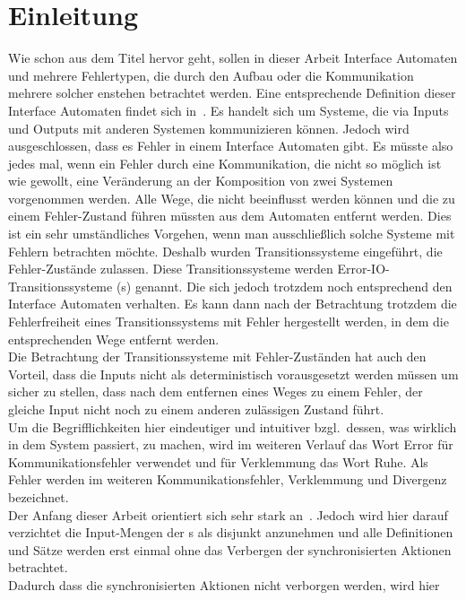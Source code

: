 \chapter{Einleitung}

Wie schon aus dem Titel hervor geht, sollen in dieser Arbeit Interface
Automaten und mehrere Fehlertypen, die durch den Aufbau oder die Kommunikation mehrere solcher enstehen
betrachtet werden. Eine entsprechende Definition dieser Interface Automaten
findet sich in~\cite{Alfaro2004}. Es handelt sich um Systeme, die via
Inputs und Outputs mit anderen Systemen kommunizieren können. Jedoch wird
ausgeschlossen, dass es Fehler in einem Interface Automaten gibt. Es müsste
also jedes mal, wenn ein Fehler durch eine Kommunikation, die nicht so möglich
ist wie gewollt, eine Veränderung an der Komposition von zwei Systemen
vorgenommen werden. Alle Wege, die nicht beeinflusst werden
können und die zu einem Fehler-Zustand führen müssten aus dem Automaten
entfernt werden. Dies ist ein sehr umständliches Vorgehen, wenn man
ausschließlich solche Systeme mit Fehlern betrachten möchte. Deshalb wurden
Transitionssysteme eingeführt, die Fehler-Zustände zulassen. Diese
Transitionssysteme werden Error-IO-Transitionssysteme (\EIO{}s) genannt. Die sich jedoch
trotzdem noch entsprechend den Interface Automaten verhalten. Es kann dann nach
der Betrachtung trotzdem die Fehlerfreiheit eines Transitionssystems mit Fehler
hergestellt werden, in dem die entsprechenden Wege entfernt werden.\\
Die Betrachtung der Transitionssysteme mit Fehler-Zuständen hat auch den
Vorteil, dass die Inputs nicht als deterministisch vorausgesetzt werden müssen
um sicher zu stellen, dass nach dem entfernen eines Weges zu einem Fehler, der
gleiche Input nicht noch zu einem anderen zulässigen Zustand führt.\\
Um die Begrifflichkeiten hier eindeutiger und intuitiver bzgl.\ dessen, was
wirklich in dem System passiert, zu machen, wird im weiteren Verlauf
das Wort Error für Kommunikationsfehler verwendet und für Verklemmung das Wort
Ruhe. Als Fehler werden im weiteren Kommunikationsfehler, Verklemmung und
Divergenz bezeichnet.\\
Der Anfang dieser Arbeit orientiert sich sehr stark an~\cite{Vogler2014EIO}.
Jedoch wird hier darauf verzichtet die Input-Mengen der \EIO{}s als disjunkt anzunehmen und alle
Definitionen und Sätze werden erst einmal ohne das Verbergen der
synchronisierten Aktionen betrachtet.\\
Dadurch dass die synchronisierten Aktionen nicht verborgen werden, wird hier
